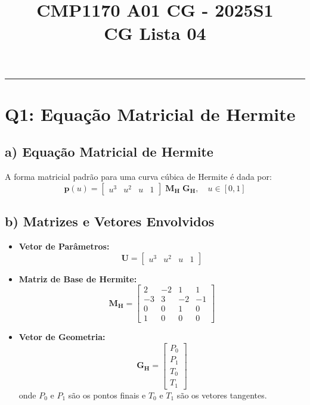 \documentclass[a4paper,12pt]{article}
\title{CMP1170 A01 CG - 2025S1 \\ CG Lista 04}
\author{}
\date{}
\begin{document}
\maketitle
\hrule
\vspace{0.5cm}

\section*{Q1: Equação Matricial de Hermite}

\subsection*{a) Equação Matricial de Hermite}
A forma matricial padrão para uma curva cúbica de Hermite é dada por:
\[
\mathbf{p}(u) = \begin{bmatrix} u^3 & u^2 & u & 1 \end{bmatrix} \; \mathbf{M_H} \; \mathbf{G_H}, \quad u \in [0,1]
\]

\subsection*{b) Matrizes e Vetores Envolvidos}
\begin{itemize}
    \item \textbf{Vetor de Parâmetros:} 
    \[
    \mathbf{U} = \begin{bmatrix} u^3 & u^2 & u & 1 \end{bmatrix}
    \]
    \item \textbf{Matriz de Base de Hermite:}
    \[
    \mathbf{M_H} = 
    \begin{bmatrix}
    2 & -2 & 1 & 1 \\
    -3 & 3 & -2 & -1 \\
    0 & 0 & 1 & 0 \\
    1 & 0 & 0 & 0
    \end{bmatrix}
    \]
    \item \textbf{Vetor de Geometria:}
    \[
    \mathbf{G_H} = 
    \begin{bmatrix}
    P_0 \\
    P_1 \\
    T_0 \\
    T_1
    \end{bmatrix}
    \]
    onde \( P_0 \) e \( P_1 \) são os pontos finais e \( T_0 \) e \( T_1 \) são os vetores tangentes.
\end{itemize}
\end{document}
